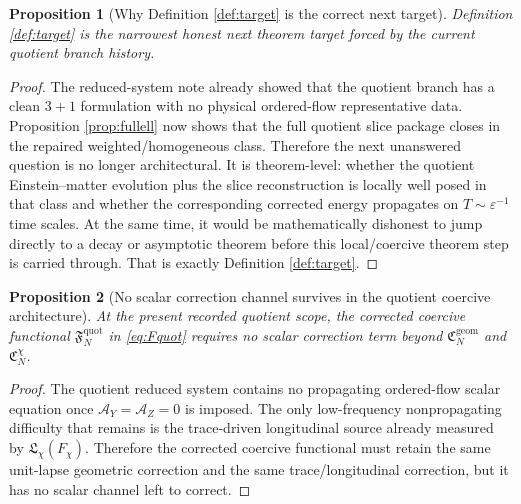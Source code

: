 \documentclass[11pt]{article}
\newtheorem{proposition}{Proposition}
\begin{document}
\begin{proposition}[Why Definition \ref{def:target} is the correct next target]
\label{prop:target}
Definition \ref{def:target} is the narrowest honest next theorem target forced by the current quotient branch history.
\end{proposition}

\begin{proof}
The reduced-system note already showed that the quotient branch has a clean \(3+1\) formulation with no physical ordered-flow representative data. Proposition \ref{prop:fullell} now shows that the full quotient slice package closes in the repaired weighted/homogeneous class. Therefore the next unanswered question is no longer architectural. It is theorem-level: whether the quotient Einstein--matter evolution plus the slice reconstruction is locally well posed in that class and whether the corresponding corrected energy propagates on \(T\sim\varepsilon^{-1}\) time scales. At the same time, it would be mathematically dishonest to jump directly to a decay or asymptotic theorem before this local/coercive theorem step is carried through. That is exactly Definition \ref{def:target}.
\end{proof}

\begin{proposition}[No scalar correction channel survives in the quotient coercive architecture]
\label{prop:noscalar}
At the present recorded quotient scope, the corrected coercive functional \(\mathfrak F_N^{\mathrm{quot}}\) in \eqref{eq:Fquot} requires no scalar correction term beyond \(\mathfrak C_N^{\mathrm{geom}}\) and \(\mathfrak C_N^{\chi}\).
\end{proposition}

\begin{proof}
The quotient reduced system contains no propagating ordered-flow scalar equation once \(\mathcal A_Y=\mathcal A_Z=0\) is imposed. The only low-frequency nonpropagating difficulty that remains is the trace-driven longitudinal source already measured by \(\mathfrak L_\chi(F_\chi)\). Therefore the corrected coercive functional must retain the same unit-lapse geometric correction and the same trace/longitudinal correction, but it has no scalar channel left to correct.
\end{proof}
\end{document}
